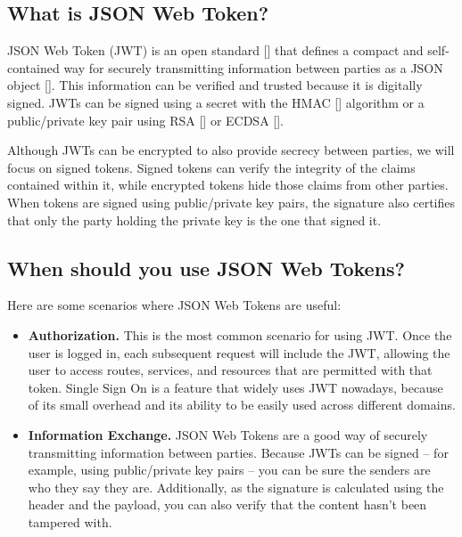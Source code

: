 \subsection{What is JSON Web Token?}\label{subsec:what-is-json-web-token?}
JSON Web Token (JWT) is an open standard [\cite{jones2015rfc}] that defines a compact and self-contained way for securely
transmitting information between parties as a JSON object [\cite{jones2015json}].
This information can be verified and trusted because it is digitally signed.
JWTs can be signed using a secret with the HMAC [\cite{wang2004hmac}] algorithm or a public/private key pair using
RSA [\cite{wiener1990cryptanalysis}] or ECDSA [\cite{johnson2001elliptic}].

Although JWTs can be encrypted to also provide secrecy between parties, we will focus on signed tokens.
Signed tokens can verify the integrity of the claims contained within it, while encrypted tokens hide those claims from
other parties.
When tokens are signed using public/private key pairs, the signature also certifies that only the party holding the
private key is the one that signed it.

\subsection{When should you use JSON Web Tokens?}\label{subsec:when-should-you-use-json-web-tokens?}

Here are some scenarios where JSON Web Tokens are useful:

\begin{itemize}
    \item \textbf{Authorization.} This is the most common scenario for using JWT. Once the user is logged in, each
    subsequent request will include the JWT, allowing the user to access routes, services, and resources that are permitted
    with that token.
    Single Sign On is a feature that widely uses JWT nowadays, because of its small overhead and its ability to be easily
    used across different domains.
    \item \textbf{Information Exchange.} JSON Web Tokens are a good way of securely transmitting information between
    parties.
    Because JWTs can be signed -- for example, using public/private key pairs -- you can be sure the senders are who they
    say they are.
    Additionally, as the signature is calculated using the header and the payload, you can also verify that the content
    hasn't been tampered with.
\end{itemize}

